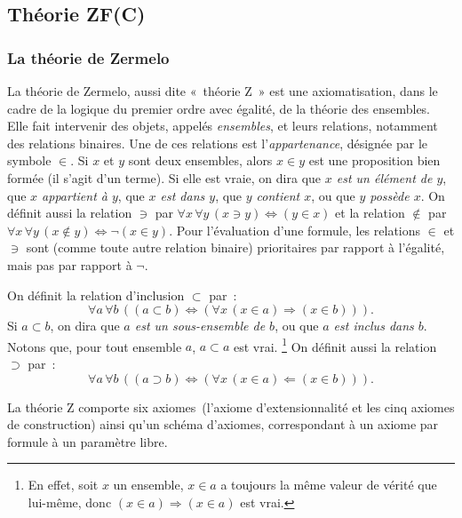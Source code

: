 \subsection{Théorie ZF(C)}

\subsubsection{La théorie de Zermelo}
\label{sub:Zermelo}

La théorie de Zermelo, aussi dite « théorie Z » est une axiomatisation, dans le cadre de la logique du premier ordre avec égalité, de la théorie des ensembles. 
Elle fait intervenir des objets, appelés \textit{ensembles}, et leurs relations, notamment des relations binaires. 
Une de ces relations est l'\textit{appartenance}, désignée par le symbole $\in$. 
Si $x$ et $y$ sont deux ensembles, alors $x \in y$ est une proposition bien formée (il s'agit d'un terme). 
Si elle est vraie, on dira que \textit{$x$ est un élément de $y$}, que \textit{$x$ appartient à $y$}, que \textit{$x$ est dans $y$}, que \textit{$y$ contient $x$}, ou que \textit{$y$ possède $x$}.
On définit aussi la relation $\ni$ par $\forall x \, \forall y \, (x \ni y) \Leftrightarrow (y \in x)$ et la relation $\notin$ par $\forall x \, \forall y \, (x \notin y) \Leftrightarrow \neg (x \in y)$. 
Pour l'évaluation d'une formule, les relations $\in$ et $\ni$ sont (comme toute autre relation binaire) prioritaires par rapport à l'égalité, mais pas par rapport à $\neg$.

On définit la relation d'inclusion $\subset$ par : 
\begin{equation*}
    \forall a \, \forall b \, (
        (a \subset b) \Leftrightarrow (\forall x \, (x \in a) \Rightarrow (x \in b))
    ). 
\end{equation*}
Si $a \subset b$, on dira que \textit{$a$ est un sous-ensemble de $b$}, ou que \textit{$a$ est inclus dans $b$}.
Notons que, pour tout ensemble $a$, $a \subset a$ est vrai.%
\footnote{En effet, soit $x$ un ensemble, $x \in a$ a toujours la même valeur de vérité que lui-même, donc $(x \in a) \Rightarrow (x \in a)$ est vrai.}
On définit aussi la relation $\supset$ par :
\begin{equation*}
    \forall a \, \forall b \, (
        (a \supset b) \Leftrightarrow (\forall x \, (x \in a) \Leftarrow (x \in b))
    ). 
\end{equation*}

La théorie Z comporte six axiomes (l'axiome d'extensionnalité et les cinq axiomes de construction) ainsi qu'un schéma d'axiomes, correspondant à un axiome par formule à un paramètre libre. 


